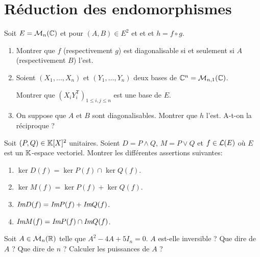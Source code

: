 \section{Réduction des endomorphismes}

\begin{exercise}
	Soit $E=\mathcal{M}_{n}(\mathbb{C})$ et pour $(A,B)\in E^{2}$ et  et  et $h=f\circ g$.
	\begin{enumerate}
		\item Montrer que $f$ (respectivement $g$) est diagonalisable si et seulement si $A$ (respectivement $B$) l'est.
		\item Soient $(X_{1},\dots,X_{n})$ et $(Y_{1},\dots,Y_{n})$ deux bases de $\mathbb{C}^{n}=\mathcal{M}_{n,1}(\mathbb{C})$.
		
		Montrer que $(X_{i}Y_{i}^{\mathsf{T}})_{1\leqslant i,j\leqslant n}$ est une base de $E$.
		\item On suppose que $A$ et $B$ sont diagonalisables. Montrer que $h$ l'est. A-t-on la réciproque ?
	\end{enumerate}
\end{exercise}

\begin{exercise}
	Soit $(P,Q)\in\mathbb{K}[X]^{2}$ unitaires. Soient $D=P\wedge Q$, $M=P\vee Q$ et $f\in\mathcal{L}(E)$ où $E$ est un $\mathbb{K}$-espace vectoriel.
	Montrer les différentes assertions suivantes:
	\begin{enumerate}
		\item $\ker D(f)=\ker P(f)\cap \ker Q(f)$.
		\item $\ker M(f)=\ker P(f)+ \ker Q(f)$.
		\item $\emph{Im} D(f)=\emph{Im} P(f)+\emph{Im} Q(f)$.
		\item $\emph{Im} M(f)=\emph{Im} P(f)\cap\emph{Im} Q(f)$.
	\end{enumerate}
\end{exercise}

\begin{exercise}
	Soit $A\in\mathcal{M}_{n}(\mathbb{R})$ telle que $A^{2}-4A+5I_{n}=0$. $A$ est-elle inversible ? Que dire de $A$ ? Que dire de $n$ ?
	Calculer les puissances de $A$ ? 
\end{exercise}

